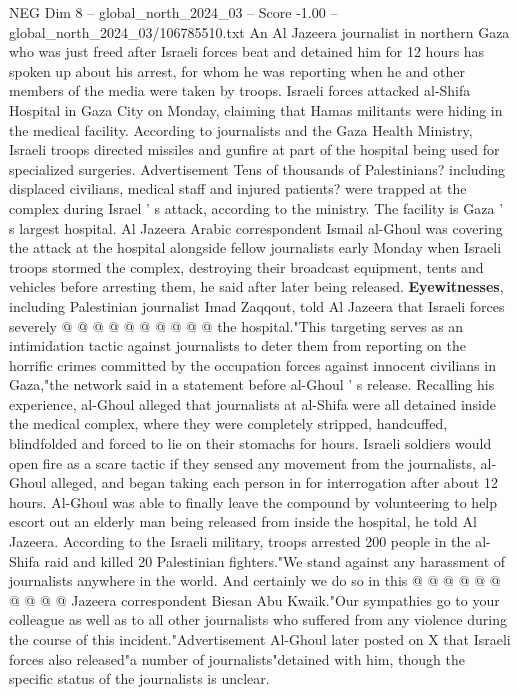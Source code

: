 \begin{textsample}{NEG Dim 8 – global\_north\_2024\_03 – Score -1.00 – global\_north\_2024\_03/106785510.txt}  \label{ex:f8_neg_441}
An Al Jazeera journalist in northern Gaza who was just freed after Israeli forces beat and detained him for 12 hours has spoken up about his arrest, for whom he was reporting when he and other members of the media were taken by troops.
Israeli forces attacked al-Shifa Hospital in Gaza City on Monday, claiming that Hamas militants were hiding in the medical facility.
According to journalists and the Gaza Health Ministry, Israeli troops directed missiles and gunfire at part of the hospital being used for specialized surgeries.
Advertisement Tens of thousands of Palestinians? including displaced civilians, medical staff and injured patients? were trapped at the complex during Israel ' s attack, according to the ministry.
The facility is Gaza ' s largest hospital.
Al Jazeera Arabic correspondent Ismail al-Ghoul was covering the attack at the hospital alongside fellow journalists early Monday when Israeli troops stormed the complex, destroying their broadcast equipment, tents and vehicles before arresting them, he said after later being released. \textbf{Eyewitnesses}, including Palestinian journalist Imad Zaqqout, told Al Jazeera that Israeli forces severely @ @ @ @ @ @ @ @ @ @ the hospital."This targeting serves as an intimidation tactic against journalists to deter them from reporting on the horrific crimes committed by the occupation forces against innocent civilians in Gaza,"the network said in a statement before al-Ghoul ' s release.
Recalling his experience, al-Ghoul alleged that journalists at al-Shifa were all detained inside the medical complex, where they were completely stripped, handcuffed, blindfolded and forced to lie on their stomachs for hours.
Israeli soldiers would open fire as a scare tactic if they sensed any movement from the journalists, al-Ghoul alleged, and began taking each person in for interrogation after about 12 hours.
Al-Ghoul was able to finally leave the compound by volunteering to help escort out an elderly man being released from inside the hospital, he told Al Jazeera.
According to the Israeli military, troops arrested 200 people in the al-Shifa raid and killed 20 Palestinian fighters."We stand against any harassment of journalists anywhere in the world.
And certainly we do so in this @ @ @ @ @ @ @ @ @ @ Jazeera correspondent Biesan Abu Kwaik."Our sympathies go to your colleague as well as to all other journalists who suffered from any violence during the course of this incident."Advertisement Al-Ghoul later posted on X that Israeli forces also released"a number of journalists"detained with him, though the specific status of the journalists is unclear.

\end{textsample}
